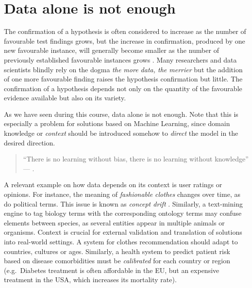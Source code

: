 \documentclass[
]{book}
\begin{document}
\hypertarget{data-is-not-enough}{%
\section{Data alone is not enough}\label{data-is-not-enough}}

The confirmation of a hypothesis is often considered to increase as the number of favourable test findings grows, but the increase in confirmation, produced by one new favourable instance, will generally become smaller as the number of previously established favourable instances grows \citep{hempel-pos}. Many researchers and data scientists blindly rely on the dogma \emph{the more data, the merrier} but the addition of one more favourable finding raises the hypothesis confirmation but little. The confirmation of a hypothesis depends not only on the quantity of the favourable evidence available but also on its variety.

As we have seen during this course, data alone is not enough. Note that this is especially a problem for solutions based on Machine Learning, since domain knowledge or \emph{context} should be introduced somehow to \emph{direct} the model in the desired direction.

\begin{quote}
``There is no learning without bias, there is no learning without knowledge'' --- \citep{skansi2020guide} \citep{domingos2015master}.
\end{quote}

A relevant example on how data depends on its context is user ratings or opinions. For instance, the meaning of \emph{fashionable clothes} changes over time, as do political terms. This issue is known as \emph{concept drift} \citep{kubat2017introduction}. Similarly, a text-mining engine to tag biology terms with the corresponding ontology terms may confuse elements between species, as several entities appear in multiple animals or organisms. Context is crucial for external validation and translation of solutions into real-world settings. A system for clothes recommendation should adapt to countries, cultures or ages. Similarly, a health system to predict patient risk based on disease comorbidities must be \emph{calibrated} for each country or region (e.g.~Diabetes treatment is often affordable in the EU, but an expensive treatment in the USA, which increases its mortality rate).
\end{document}
